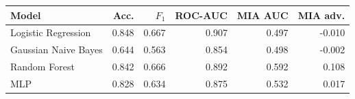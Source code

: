 \begin{tabular}{lrrrrr}
\toprule
Model & Acc. & $F_1$ & ROC-AUC & MIA AUC & MIA adv. \\
\midrule
Logistic Regression & 0.848 & 0.667 & 0.907 & 0.497 & -0.010 \\
Gaussian Naive Bayes & 0.644 & 0.563 & 0.854 & 0.498 & -0.002 \\
Random Forest & 0.842 & 0.666 & 0.892 & 0.592 & 0.108 \\
MLP & 0.828 & 0.634 & 0.875 & 0.532 & 0.017 \\
\bottomrule
\end{tabular}

